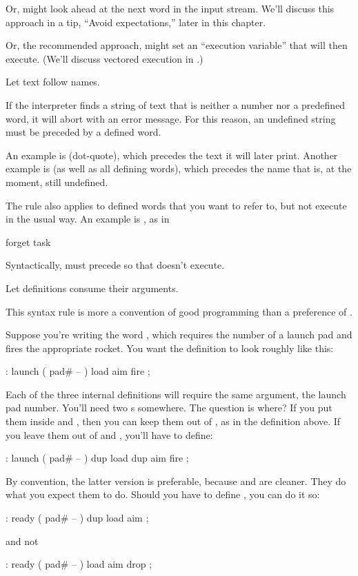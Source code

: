 Or,  might look ahead at the next word in the input stream.
We'll discuss this approach in a tip, ``Avoid expectations,'' later in this
chapter.

Or, the recommended approach,  might set an ``execution
variable'' that  will then execute. (We'll discuss vectored
execution in .)

\begin{tip}
Let text follow names.
\end{tip}
If the \Forth{} interpreter finds a string of text that is neither a number
nor a predefined word, it will abort with an error message. For this
reason, an undefined string must be preceded by a defined word.

An example is  (dot-quote), which precedes the text it will
later print. Another example is  (as well as all defining
words), which precedes the name that is, at the moment, still undefined.

The rule also applies to defined words that you want to refer to, but
not execute in the usual way. An example is , as in

\begin{Code}
forget task
\end{Code}
Syntactically,  must precede  so that
 doesn't execute.

\begin{tip}
Let definitions consume their arguments.
\end{tip}
This syntax rule is more a convention of good \Forth{} programming
than a preference of \Forth{}.

Suppose you're writing the word , which requires the
number of a launch pad and fires the appropriate rocket. You want the
definition to look roughly like this:
\begin{Code}
: launch  ( pad# -- )  load  aim  fire ;
\end{Code}
Each of the three internal definitions will require the same argument, the
launch pad number. You'll need two s somewhere. The question
is where? If you put them inside  and , then you
can keep them out of , as in the definition above. If you
leave them out of  and , you'll have to define:
\begin{Code}
: launch  ( pad# -- )  dup load  dup aim  fire ;
\end{Code}
By convention, the latter version is preferable, because  and
 are cleaner. They do what you expect them to do. Should you
have to define , you can do it so:
\begin{Code}
: ready  ( pad# -- )  dup load  aim ;
\end{Code}
and not
\begin{Code}
: ready  ( pad# -- )  load  aim  drop ;
\end{Code}

